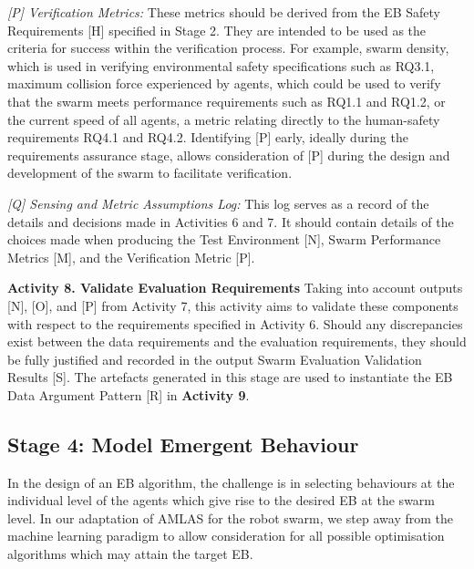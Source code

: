 \documentclass{article}
\begin{document}
\emph{[P] Verification Metrics:} These metrics should be derived from the EB Safety Requirements [H] specified in Stage 2. 
They are intended to be used as the criteria for success within the verification process. 
For example, swarm density, which is used in verifying environmental safety specifications such as RQ3.1, maximum collision force experienced by agents, which could be used to verify that the swarm meets performance requirements such as RQ1.1 and RQ1.2, or the current speed of all agents, a metric relating directly to the human-safety requirements RQ4.1 and RQ4.2. 
Identifying [P] early, ideally during the requirements assurance stage, allows consideration of [P] during the design and development of the swarm to facilitate verification.  

\emph{[Q] Sensing and Metric Assumptions Log:} This log serves as a record of the details and decisions made in Activities 6 and 7. It should contain details of the choices made when producing the Test Environment [N], Swarm Performance Metrics [M], and the Verification Metric [P].

\noindent\textbf{Activity 8. Validate Evaluation Requirements} Taking into account outputs [N], [O], and [P] from Activity 7, this activity aims to validate these components with respect to the requirements specified in Activity 6. Should any discrepancies exist between the data requirements and the evaluation requirements, they should be fully justified and recorded in the output Swarm Evaluation Validation Results [S]. 
The artefacts generated in this stage are used to instantiate the EB Data Argument Pattern [R] in \textbf{Activity 9}.

\subsection{Stage 4: Model Emergent Behaviour} \label{framework-stage4}
In the design of an EB algorithm, the challenge is in selecting behaviours at the individual level of the agents which give rise to the desired EB at the swarm level. 
In our adaptation of AMLAS for the robot swarm,  we step away from the machine learning paradigm to allow consideration for all possible optimisation algorithms which may attain the target EB.
\end{document}

